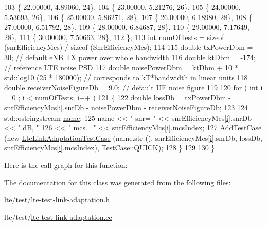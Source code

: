 \begin{DoxyCode}
103     \{ 22.00000,  4.89060,        24\},
104     \{ 23.00000,  5.21276,        26\},
105     \{ 24.00000,  5.53693,        26\},
106     \{ 25.00000,  5.86271,        28\},
107     \{ 26.00000,  6.18980,        28\},
108     \{ 27.00000,  6.51792,        28\},
109     \{ 28.00000,  6.84687,        28\},
110     \{ 29.00000,  7.17649,        28\},
111     \{ 30.00000,  7.50663,        28\},
112   \};
113   \textcolor{keywordtype}{int} numOfTests = \textcolor{keyword}{sizeof} (snrEfficiencyMcs) / \textcolor{keyword}{sizeof} (SnrEfficiencyMcs);
114 
115   \textcolor{keywordtype}{double} txPowerDbm = 30; \textcolor{comment}{// default eNB TX power over whole bandwidth}
116   \textcolor{keywordtype}{double} ktDbm = -174;    \textcolor{comment}{// reference LTE noise PSD}
117   \textcolor{keywordtype}{double} noisePowerDbm = ktDbm + 10 * std::log10 (25 * 180000); \textcolor{comment}{// corresponds to kT*bandwidth in linear
       units}
118   \textcolor{keywordtype}{double} receiverNoiseFigureDb = 9.0; \textcolor{comment}{// default UE noise figure}
119 
120   \textcolor{keywordflow}{for} ( \textcolor{keywordtype}{int} \hyperlink{bernuolliDistribution_8m_a6f6ccfcf58b31cb6412107d9d5281426}{i} = 0 ; \hyperlink{bernuolliDistribution_8m_a6f6ccfcf58b31cb6412107d9d5281426}{i} < numOfTests; \hyperlink{bernuolliDistribution_8m_a6f6ccfcf58b31cb6412107d9d5281426}{i}++ )
121     \{
122       \textcolor{keywordtype}{double} lossDb = txPowerDbm - snrEfficiencyMcs[\hyperlink{bernuolliDistribution_8m_a6f6ccfcf58b31cb6412107d9d5281426}{i}].snrDb - noisePowerDbm - receiverNoiseFigureDb;
123 
124       std::ostringstream \hyperlink{generate__test__data__lte__spectrum__model_8m_ab74e6bf80237ddc4109968cedc58c151}{name};
125       name << \textcolor{stringliteral}{" snr= "} << snrEfficiencyMcs[\hyperlink{bernuolliDistribution_8m_a6f6ccfcf58b31cb6412107d9d5281426}{i}].snrDb << \textcolor{stringliteral}{" dB, "}
126            << \textcolor{stringliteral}{" mcs= "} << snrEfficiencyMcs[\hyperlink{bernuolliDistribution_8m_a6f6ccfcf58b31cb6412107d9d5281426}{i}].mcsIndex;
127       \hyperlink{classns3_1_1TestCase_a3718088e3eefd5d6454569d2e0ddd835}{AddTestCase} (\textcolor{keyword}{new} \hyperlink{classLteLinkAdaptationTestCase}{LteLinkAdaptationTestCase} (name.str (),  
      snrEfficiencyMcs[\hyperlink{bernuolliDistribution_8m_a6f6ccfcf58b31cb6412107d9d5281426}{i}].snrDb, lossDb, snrEfficiencyMcs[\hyperlink{bernuolliDistribution_8m_a6f6ccfcf58b31cb6412107d9d5281426}{i}].mcsIndex), TestCase::QUICK);
128     \}
129 
130 \}
\end{DoxyCode}


Here is the call graph for this function\+:




The documentation for this class was generated from the following files\+:\begin{DoxyCompactItemize}
\item 
lte/test/\hyperlink{lte-test-link-adaptation_8h}{lte-\/test-\/link-\/adaptation.\+h}\item 
lte/test/\hyperlink{lte-test-link-adaptation_8cc}{lte-\/test-\/link-\/adaptation.\+cc}\end{DoxyCompactItemize}
